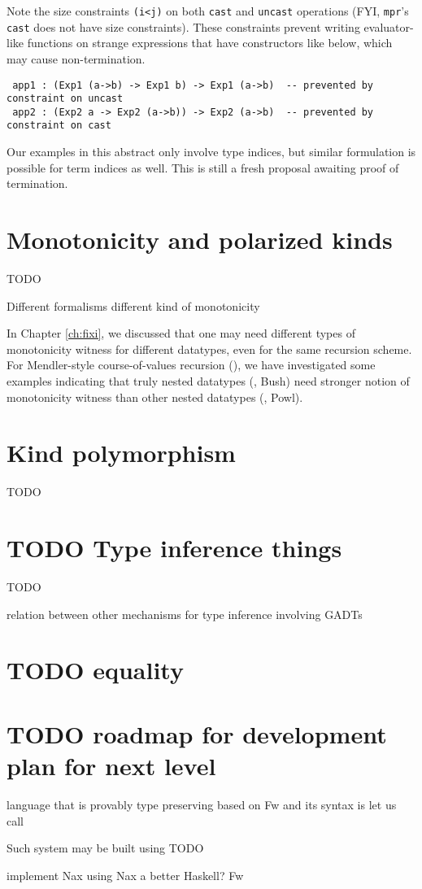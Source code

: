 \noindent
Note the size constraints \texttt{(i\;<\;j)} on both \texttt{cast} and \texttt{uncast} operations
(FYI, \texttt{mpr}'s \texttt{cast} does not have size constraints).
These constraints prevent writing evaluator-like functions on strange expressions
that have constructors like below, which may cause non-termination.\vspace*{-.5ex}
{\small
\begin{verbatim}
 app1 : (Exp1 (a->b) -> Exp1 b) -> Exp1 (a->b)  -- prevented by constraint on uncast
 app2 : (Exp2 a -> Exp2 (a->b)) -> Exp2 (a->b)  -- prevented by constraint on cast
\end{verbatim} }\vspace*{-.5ex}
\noindent
Our examples in this abstract only involve type indices, but similar
formulation is possible for term indices as well.\vspace*{-1.5ex}
This is still a fresh proposal awaiting proof of termination.












\section{Monotonicity and polarized kinds}
TODO

Different formalisms different kind of monotonicity

In Chapter \ref{ch:fixi}, we discussed that one may need
different types of monotonicity witness for different datatypes,
even for the same recursion scheme.
For Mendler-style course-of-values recursion (\McvPr),
we have investigated some examples indicating that
truly nested datatypes (\eg, Bush) need stronger notion of
monotonicity witness than other nested datatypes (\eg, Powl).


\section{Kind polymorphism}\label{sec:futwork:kindpoly}
TODO

\section{TODO Type inference things}
TODO

relation between other mechanisms for type inference involving GADTs

\section{TODO equality}

\section{TODO roadmap for development plan for next level}

language that is provably type preserving
based on Fw and its syntax is 
let us call

Such system may be built using TODO


implement Nax using Nax
a better Haskell?
Fw
